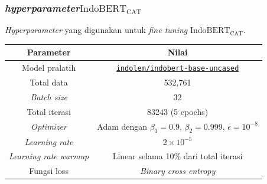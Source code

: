 \documentclass[10pt]{beamer}
\newcommand{\f}[1]{\textit{#1}}
\newcommand{\code}[1]{\texttt{#1}}
\begin{document}
\begin{frame}
    \frametitle{ \f{hyperparameter}$\text{IndoBERT}_{\text{CAT}}$}
    \f{Hyperparameter} yang digunakan untuk \f{fine tuning }$\text{IndoBERT}_{\text{CAT}}$.
    \begin{table}[!ht]
        \centering
        \small
        \label{tab:indobert-cat-hyperparameter}
        \begin{tabular}{|c|c|}
            \hline
            \textbf{Parameter}       & \textbf{Nilai}                                                                                    \\
            \hline
            Model pralatih           & \href{https://huggingface.co/indolem/indobert-base-uncased}{\code{indolem/indobert-base-uncased}} \\
            \hline
            Total data               & 532,761                                                                                     \\
            \hline
            \f{Batch size}           & 32                                                                                                \\
            \hline
            Total iterasi            & 83243 (5 epochs)                                                                                  \\
            \hline
            \f{Optimizer}            & Adam dengan $\beta_1 = 0.9$, $\beta_2 = 0.999$, $\epsilon = 10^{-8}$                                 \\
            \hline
            \f{Learning rate}        & $2\times 10^{-5}$                                                                                              \\
            \hline
            \f{Learning rate warmup} & Linear selama 10\% dari total iterasi                                                             \\
            \hline
            Fungsi loss              & \f{Binary cross entropy}                                                                          \\
            \hline
        \end{tabular}
    \end{table}
    

\end{frame}
\end{document}
